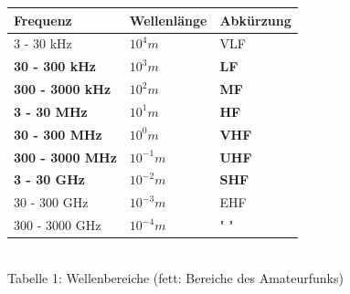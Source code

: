 \begin{frame}
  \begin{center}
    \begin{Large}
      \begin{tabular}{|l|l|l|}
        \hline
        Frequenz & Wellenlänge & Abkürzung\\
        \hline \hline
        3 - 30 kHz     & $10^{4}m$    & VLF \\ \hline
        \textbf{30 - 300 kHz}   & \textbf{$10^{3}m$}      & \textbf{LF}  \\ \hline
        \textbf{300 - 3000 kHz} & \textbf{$10^{2}m$}     & \textbf{MF}  \\ \hline
        \textbf{3 - 30 MHz}     & \textbf{$10^{1}m$}      & \textbf{HF}  \\ \hline
        \textbf{30 - 300 MHz}   & \textbf{$10^{0}m$}          & \textbf{VHF} \\ \hline
        \textbf{300 - 3000 MHz} & \textbf{$10^{-1}m$}      & \textbf{UHF} \\ \hline
        \textbf{3 - 30 GHz}     & \textbf{$10^{-2}m$}     & \textbf{SHF} \\ \hline
        30 - 300 GHz   & $10^{-3}m$     & EHF \\ \hline
        300 - 3000 GHz & $10^{-4}m$ & " " \\ \hline
      \end{tabular}\\[1em]
      {\scriptsize Tabelle 1: Wellenbereiche (fett: Bereiche des Amateurfunks)}
    \end{Large}
  \end{center}
\end{frame}

